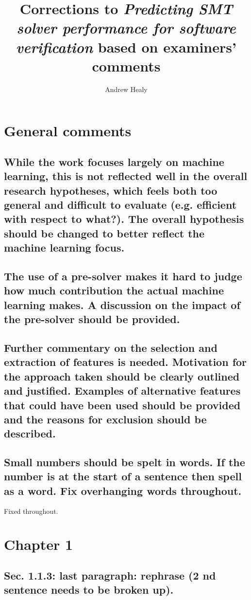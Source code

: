 \documentclass[]{article}
\title{Corrections to \emph{Predicting SMT solver performance for software verification} based on examiners' comments}
\author{Andrew Healy}
\begin{document}
\maketitle

\section{General comments}

\subsection{While the work focuses largely on machine learning, this is not reflected well in the overall research hypotheses, which feels both too general and difficult to evaluate (e.g. efficient with respect to what?). The overall hypothesis should be changed to better reflect the machine learning focus.}
 
\subsection{The use of a pre-solver makes it hard to judge how much contribution the actual machine learning makes. A discussion on the impact of the pre-solver should be provided.}
	
\subsection{Further commentary on the selection and extraction of features is needed. Motivation for the approach taken should be clearly outlined and justified. Examples of alternative features that could have been used should be provided and the reasons for exclusion should be described.}

\subsection{Small numbers should be spelt in words. If the number is at the start of a sentence then spell as a word. Fix overhanging words throughout.}
\label{overhang-numbers}
Fixed throughout.

\section{Chapter 1}

\subsection{Sec. 1.1.3: last paragraph: rephrase (2 nd sentence needs to be broken up).}
\end{document}
